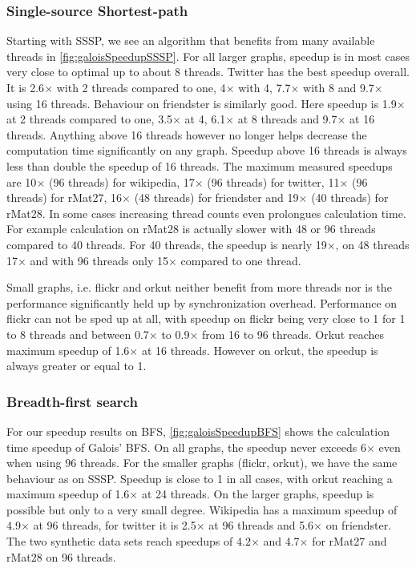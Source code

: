 \subsubsection{Single-source Shortest-path}

Starting with SSSP, we see an algorithm that benefits from many available threads in \autoref{fig:galoisSpeedupSSSP}.
For all larger graphs, speedup is in most cases very close to optimal up to about 8 threads.
Twitter has the best speedup overall. It is 2.6$\times$ with 2 threads compared to one, 4$\times$ with 4, 7.7$\times$ with 8 and 9.7$\times$ using 16 threads.
Behaviour on friendster is similarly good. Here speedup is 1.9$\times$ at 2 threads compared to one, 3.5$\times$ at 4, 6.1$\times$ at 8 threads and 9.7$\times$ at 16 threads.
Anything above 16 threads however no longer helps decrease the computation time significantly on any graph. Speedup above 16 threads is always less than double the speedup of 16 threads. The maximum measured speedups are 10$\times$ (96 threads) for wikipedia, 17$\times$ (96 threads) for twitter, 11$\times$ (96 threads) for rMat27, 16$\times$ (48 threads) for friendster and 19$\times$ (40 threads) for rMat28.
In some cases increasing thread counts even prolongues calculation time. For example calculation on rMat28 is actually slower with 48 or 96 threads compared to 40 threads. For 40 threads, the speedup is nearly 19$\times$, on 48 threads 17$\times$ and with 96 threads only 15$\times$ compared to one thread.

Small graphs, i.e. flickr and orkut neither benefit from more threads nor is the performance significantly held up by synchronization overhead.
Performance on flickr can not be sped up at all, with speedup on flickr being very close to 1 for 1 to 8 threads and between 0.7$\times$ to 0.9$\times$ from 16 to 96 threads.
Orkut reaches maximum speedup of 1.6$\times$ at 16 threads. However on orkut, the speedup is always greater or equal to 1.


\subsubsection{Breadth-first search}


For our speedup results on BFS, \autoref{fig:galoisSpeedupBFS} shows the calculation time speedup of Galois' BFS.
On all graphs, the speedup never exceeds 6$\times$ even when using 96 threads.
For the smaller graphs (flickr, orkut), we have the same behaviour as on SSSP. Speedup is close to 1 in all cases, with orkut reaching a maximum speedup of 1.6$\times$ at 24 threads.
On the larger graphs, speedup is possible but only to a very small degree.
Wikipedia has a maximum speedup of 4.9$\times$ at 96 threads, for twitter it is 2.5$\times$ at 96 threads and 5.6$\times$ on friendster. The two synthetic data sets reach speedups of 4.2$\times$ and 4.7$\times$ for rMat27 and rMat28 on 96 threads.


